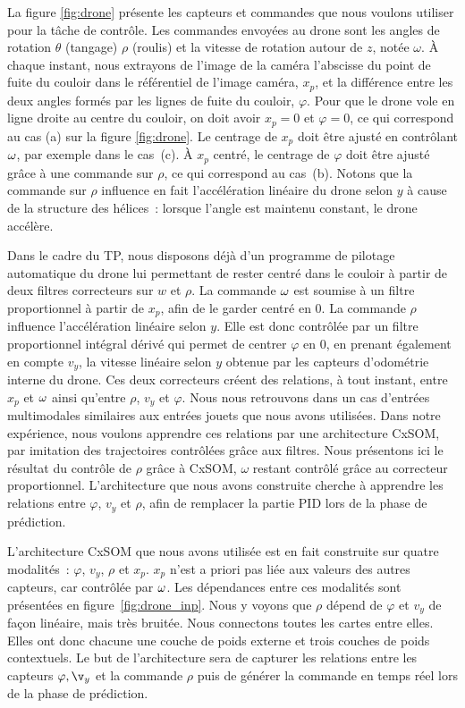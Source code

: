 \documentclass[../main]{subfiles}
\begin{document}
La figure \ref{fig:drone} présente les capteurs et commandes que nous voulons utiliser pour la tâche de contrôle.
Les commandes envoyées au drone sont les angles de rotation $\theta$ (tangage) $\rho$ (roulis) et la vitesse de rotation autour de $z$, notée $\omega$. 
\`A chaque instant, nous extrayons de l'image de la caméra l'abscisse du point de fuite du couloir dans le référentiel de l'image caméra, $x_p$, et la différence entre les deux angles formés par les lignes de fuite du couloir, $\varphi$.
Pour que le drone vole en ligne droite au centre du couloir, on doit avoir $x_p = 0$ et $\varphi = 0$, ce qui correspond au cas (a) sur la figure \ref{fig:drone}.
Le centrage de $x_p$ doit être ajusté en contrôlant $\omega$, par exemple dans le cas~(c).
\`A $x_p$ centré, le centrage de $\varphi$ doit être ajusté grâce à une commande sur $\rho$, ce qui correspond au cas~(b). Notons que la commande sur $\rho$ influence en fait l'accélération linéaire du drone selon $y$ à cause de la structure des hélices~: lorsque l'angle est maintenu constant, le drone accélère.


Dans le cadre du TP, nous  disposons déjà d'un programme de pilotage automatique du drone lui permettant de rester centré dans le couloir à partir de deux filtres correcteurs sur $w$ et $\rho$.
La commande $\omega$ est soumise à un filtre proportionnel à partir de $x_p$, afin de le garder centré en 0.
La commande $\rho$ influence l'accélération linéaire selon $y$.
Elle est donc contrôlée par un filtre proportionnel intégral dérivé qui permet de centrer $\varphi$ en 0, en prenant également en compte $v_y$, la vitesse linéaire selon $y$ obtenue par les capteurs d'odométrie interne du drone.
Ces deux correcteurs créent des relations, à tout instant, entre $x_p$ et $\omega$ ainsi qu'entre $\rho$, $v_y$ et $\varphi$.
Nous nous retrouvons dans un cas d'entrées multimodales similaires aux entrées jouets que nous avons utilisées.
Dans notre expérience, nous voulons apprendre ces relations par une architecture CxSOM, par imitation des trajectoires contrôlées grâce aux filtres.
Nous présentons ici le résultat du contrôle de $\rho$ grâce à CxSOM, $\omega$ restant contrôlé grâce au correcteur proportionnel. L'architecture que nous avons construite cherche à apprendre les relations entre $\varphi$, $v_y$ et $\rho$, afin de remplacer la partie PID lors de la phase de prédiction. 

L'architecture CxSOM que nous avons utilisée est en fait construite sur quatre modalités~: $\varphi$, $v_y$, $\rho$ et $x_p$.
$x_p$ n'est a priori pas liée aux valeurs des autres capteurs, car contrôlée par $\omega$.
Les dépendances entre ces modalités sont présentées en figure~\ref{fig:drone_inp}. Nous y voyons que $\rho$ dépend de $\varphi$ et $v_y$ de façon linéaire, mais très bruitée.
Nous connectons toutes les cartes entre elles.
 Elles ont donc chacune une couche de poids externe et trois couches de poids contextuels. Le but de l'architecture sera de capturer les relations entre les capteurs $\varphi, \v_y$ et la commande $\rho$ puis de générer la commande en temps réel lors de la phase de prédiction. 
\end{document}
